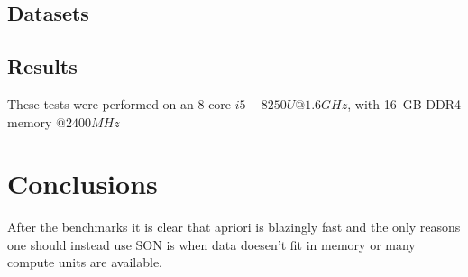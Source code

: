 \documentclass[a4paper]{article}
\begin{document}
	\subsection{Datasets}

	\subsection{Results}
	These tests were performed on an 8 core $i5-8250U @1.6GHz$, with 16 GB DDR4 memory $@2400MHz$
	
	
	\section{Conclusions}
	After the benchmarks it is clear that apriori is blazingly fast and the only reasons one should instead use SON is when data doesen't fit in memory or many compute units are available.
	
\end{document}
